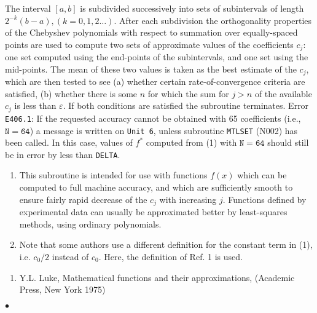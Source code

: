 \Method
The interval $[a,b]$ is subdivided successively
into sets of subintervals of length  $2^{-k}(b-a),(k = 0,1,2\ldots)$.
After each subdivision the orthogonality properties
of the Chebyshev polynomials with respect to summation
over equally-spaced points are used
to compute two sets of approximate values of the coefficients $c_j$:
one set computed using the end-points of the subintervals, and one
set using the mid-points. The mean of these two values is taken
as the best estimate of the $c_j$, which are then tested to see (a)
whether certain rate-of-convergence criteria are satisfied, (b)
whether there is some $n$ for which the sum for $j>n$ of the available
$c_j$ is less than $\varepsilon$. If both conditions are satisfied
the subroutine terminates.
\Errorh
Error {\tt E406.1}:
If the requested accuracy cannot be obtained with 65 coefficients
(i.e., $\mathtt{N = 64}$) a message is written on
{\tt Unit 6}, unless subroutine {\tt MTLSET} (N002) has been called.
In this case, values of $f^*$ computed from (1) with $\mathtt{N = 64}$
should still be in error by less than {\tt DELTA}.
\Notes
\begin{enumerate}
\item This subroutine is intended for use with functions $f(x)$ which
can be computed to full machine accuracy, and which are sufficiently
smooth to ensure fairly rapid decrease of the $c_j$ with
increasing $j$. Functions defined by experimental data can usually
be approximated better by least-squares methods, using ordinary
polynomials.
\item Note that some authors use a different definition for the
constant term in (1), i.e. $c_0/2$ instead of $c_0$. Here, the
definition of Ref. 1 is used.
\end{enumerate}
\Refer
\begin{enumerate}
\item Y.L. Luke, Mathematical functions and their approximations,
(Academic Press, New York 1975)
\end{enumerate}
$\bullet$
